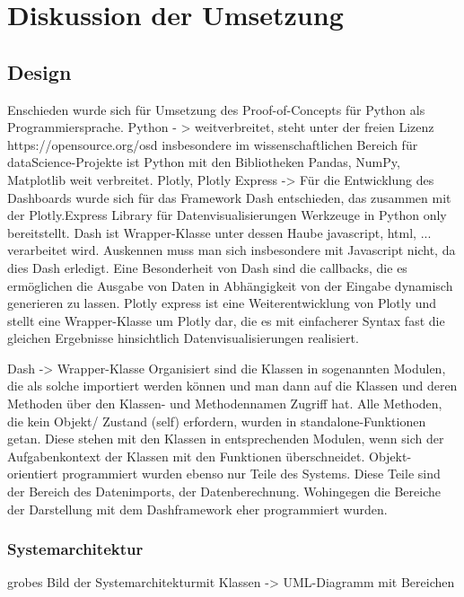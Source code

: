 \chapter{Diskussion der Umsetzung}
\label{chap:five}
\section{Design}
Enschieden wurde sich für Umsetzung  des Proof-of-Concepts für Python als Programmiersprache.
Python - > weitverbreitet, steht unter der freien Lizenz https://opensource.org/osd
insbesondere im wissenschaftlichen Bereich für dataScience-Projekte ist Python mit den Bibliotheken Pandas, NumPy, Matplotlib
weit verbreitet. 
Plotly, Plotly Express ->
Für die Entwicklung des Dashboards wurde sich für das Framework Dash entschieden, das zusammen mit der Plotly.Express Library für Datenvisualisierungen  Werkzeuge in Python only bereitstellt.  Dash ist Wrapper-Klasse unter dessen Haube javascript, html, ... verarbeitet wird. Auskennen muss man sich insbesondere mit Javascript nicht, da dies Dash erledigt.
Eine Besonderheit von Dash sind die callbacks, die es ermöglichen die Ausgabe von Daten in Abhängigkeit von der Eingabe dynamisch generieren zu lassen.
Plotly express ist eine Weiterentwicklung von Plotly und stellt eine Wrapper-Klasse um Plotly dar, die es mit einfacherer Syntax fast die gleichen Ergebnisse hinsichtlich Datenvisualisierungen realisiert.

Dash -> 
Wrapper-Klasse 
Organisiert sind die Klassen in sogenannten Modulen, die als solche importiert werden können und man dann auf die Klassen und deren Methoden 
über den Klassen- und Methodennamen Zugriff hat.
Alle Methoden, die kein Objekt/ Zustand (self) erfordern, wurden in standalone-Funktionen getan. Diese stehen mit den Klassen in entsprechenden Modulen,
wenn sich der Aufgabenkontext der Klassen mit den Funktionen überschneidet.
Objekt-orientiert programmiert wurden ebenso nur Teile des Systems. Diese Teile sind der Bereich des Datenimports, der Datenberechnung. Wohingegen die Bereiche der Darstellung mit dem Dashframework eher programmiert wurden. 



    \subsection{Systemarchitektur}
    
    grobes Bild der Systemarchitekturmit Klassen -> UML-Diagramm mit Bereichen
    

